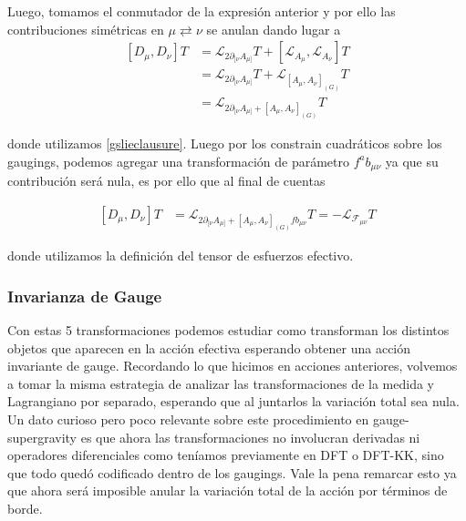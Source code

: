 \documentclass{article}
\numberwithin{equation}{section}
\begin{document}
Luego, tomamos el conmutador de la expresión anterior y por ello las
contribuciones simétricas en $\mu\rightleftarrows\nu$ se anulan dando
lugar a 
\begin{align*}
\left[D_{\mu},D_{\nu}\right]T & =\mathcal{L}_{2\partial_{[\nu}A_{\mu]}}T+\left[\mathcal{L}_{A_{\mu}},\mathcal{L}_{A_{\nu}}\right]T\\
& =\mathcal{L}_{2\partial_{[\nu}A_{\mu]}}T+\mathcal{L}_{\left[A_{\mu},A_{\nu}\right]_{(G)}}T\\
& =\mathcal{L}_{2\partial_{[\nu}A_{\mu]}+\left[A_{\mu},A_{\nu}\right]_{(G)}}T
\end{align*}


donde utilizamos \ref{gslieclausure}. Luego por los constrain cuadráticos
sobre los gaugings, podemos agregar una transformación de parámetro
$f^{a}b_{\mu\nu}$ ya que su contribución será nula, es por ello que
al final de cuentas

\begin{boxeq}
	\begin{equation}\label{hatricciidentity}
	\begin{aligned}
	\left[D_{\mu},D_{\nu}\right]T & =\mathcal{L}_{2\partial_{[\nu}A_{\mu]}+\left[A_{\mu},A_{\nu}\right]_{(G)}fb_{\mu\nu}}T=-\mathcal{L}_{\mathcal{F}_{\mu\nu}}T
	\end{aligned}
	\end{equation}
\end{boxeq}

donde utilizamos la definición del tensor de esfuerzos efectivo.



\subsubsection{Invarianza de Gauge}

Con estas 5 transformaciones podemos estudiar como transforman los distintos objetos que aparecen en la acción efectiva esperando obtener una acción invariante de gauge. Recordando lo que hicimos en acciones anteriores, volvemos a tomar la misma estrategia de analizar las transformaciones de la medida y Lagrangiano por separado, esperando que al juntarlos la variación total sea nula. Un dato curioso pero poco relevante sobre este procedimiento en gauge-supergravity es que ahora las transformaciones no involucran derivadas ni operadores diferenciales como teníamos previamente en DFT o DFT-KK, sino que todo quedó codificado dentro de los gaugings. Vale la pena remarcar esto ya que ahora será imposible anular la variación total de la acción por términos de borde.
\end{document}
